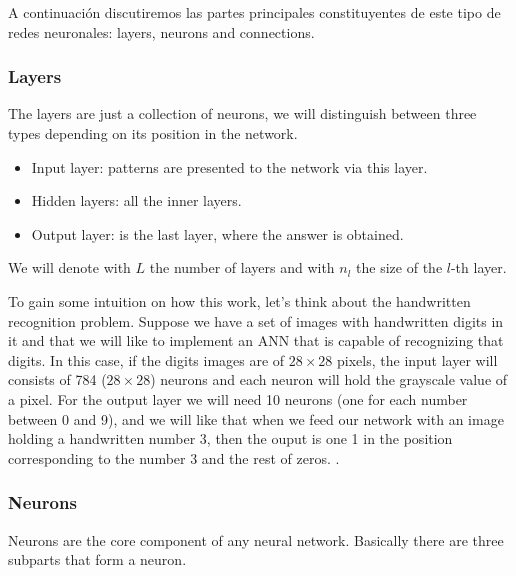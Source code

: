 A continuación discutiremos las partes principales constituyentes de este tipo
de redes neuronales: layers, neurons and connections.

\subsubsection{Layers}
The layers are just a collection of neurons, we will distinguish between three
types depending on its position in the network.

\begin{itemize}
  \item Input layer: patterns are presented to the network via this layer.
  \item Hidden layers: all the inner layers.
  \item Output layer: is the last layer, where the answer is obtained.
\end{itemize}

We will denote with \(L\) the number of layers and with \(n_l\) the size of the
\(l\)-th layer.

To gain some intuition on how this work, let's think about the handwritten
recognition problem. Suppose we have a set of images with handwritten digits in
it and that we will like to implement an ANN that is capable of recognizing
that digits. In this case, if the digits images are of \(28 \times 28\) pixels,
the input layer will consists of 784 (\(28 \times 28\)) neurons and each neuron
will hold the grayscale value of a pixel. For the output layer we will need 10
neurons (one for each number between 0 and 9), and we will like that when we
feed our network with an image holding a handwritten number 3, then the ouput
is one 1 in the position corresponding to the number 3 and the rest of zeros.
.

\subsubsection{Neurons}
Neurons are the core component of any neural network. Basically there are three
subparts that form a neuron.

